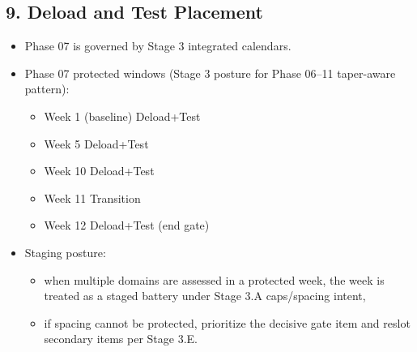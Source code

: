 \documentclass[10pt]{article}
\begin{document}
\begin{landscape}
\subsection*{9. Deload and Test Placement}

\begin{itemize}
\item Phase 07 is governed by Stage 3 integrated calendars.
\item Phase 07 protected windows (Stage 3 posture for Phase 06–11 taper-aware pattern):
  \begin{itemize}
  \item Week 1 (baseline) Deload+Test
  \item Week 5 Deload+Test
  \item Week 10 Deload+Test
  \item Week 11 Transition
  \item Week 12 Deload+Test (end gate)
  \end{itemize}
\item Staging posture:
  \begin{itemize}
  \item when multiple domains are assessed in a protected week, the week is treated as a staged battery under Stage 3.A caps/spacing intent,
  \item if spacing cannot be protected, prioritize the decisive gate item and reslot secondary items per Stage 3.E.
  \end{itemize}
\end{itemize}

\end{landscape}
\end{document}
